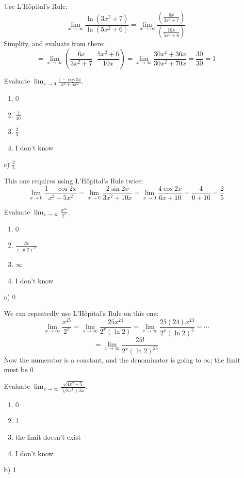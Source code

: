 \documentclass[addpoints,12pt,answers]{exam}
\begin{document}
\begin{questions}
\begin{solution}
    Use L'H\^{o}pital's Rule:
    $$\lim_{x\to\infty}\frac{\ln(3x^2+7)}{\ln(5x^2+6)}=\lim_{x\to\infty}\frac{\left(\frac{6x}{3x^2+7}\right)}{\left(\frac{10x}{5x^2+6}\right)}$$
    Simplify, and evaluate from there:
    $$=\lim_{x\to\infty}\left(\frac{6x}{3x^2+7}\cdot\frac{5x^2+6}{10x}\right)=\lim_{x\to\infty}\frac{30x^2+36x}{30x^2+70x}=\frac{30}{30}=1$$
  \end{solution}
  \newpage
  \question
  Evaluate $\displaystyle\lim_{x\to 0}\frac{1-\cos 2x}{x^3+5x^2}$.
  \begin{enumerate}[label=\alph*)]
    \item
    0
    \item
    $\displaystyle\frac{1}{10}$
    \item
    $\displaystyle\frac{2}{5}$
    \item
    I don't know
  \end{enumerate}
  \begin{solution}
    c) $\displaystyle\frac{2}{5}$
    
    This one requires using L'H\^{o}pital's Rule twice:
    $$\lim_{x\to 0}\frac{1-\cos 2x}{x^3+5x^2}=\lim_{x\to 0}\frac{2\sin 2x}{3x^2+10x}=\lim_{x\to 0}\frac{4\cos 2x}{6x+10}=\frac{4}{0+10}=\frac{2}{5}$$
  \end{solution}
  \newpage
  \question
  Evaluate $\displaystyle\lim_{x\to\infty}\frac{x^{25}}{2^x}$.
  \begin{enumerate}[label=\alph*)]
    \item
    0
    \item
    $\displaystyle\frac{25!}{(\ln 2)^{25}}$
    \item
    $\infty$
    \item
    I don't know
  \end{enumerate}
  \begin{solution}
    a) 0
    
    We can repeatedly use L'H\^{o}pital's Rule on this one:
    $$\lim_{x\to\infty}\frac{x^{25}}{2^x}=\lim_{x\to\infty}\frac{25x^{24}}{2^x(\ln 2)}=\lim_{x\to\infty}\frac{25(24)x^{23}}{2^x(\ln 2)^2}=\cdots$$
    $$=\lim_{x\to\infty}\frac{25!}{2^x(\ln 2)^{25}}$$
    Now the numerator is a constant, and the denominator is going to $\infty$; the limit must be 0.
  \end{solution}
  \newpage
  \question
  Evaluate $\displaystyle\lim_{x\to\infty}\frac{\sqrt{4x^2+5}}{\sqrt[3]{8x^3+3x}}$.
  \begin{enumerate}[label=\alph*)]
    \item
    0
    \item
    1
    \item
    the limit doesn't exist
    \item
    I don't know
  \end{enumerate}
  \begin{solution}
    b) 1
    

\end{solution}
\end{questions}
\end{document}

